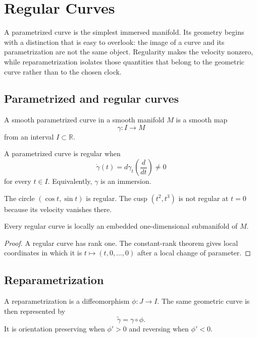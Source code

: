\chapter{Regular Curves}
\label{ch:vii12-regular-curves}

A parametrized curve is the simplest immersed manifold. Its geometry begins with a distinction that is easy to overlook: the image of a curve and its parametrization are not the same object. Regularity makes the velocity nonzero, while reparametrization isolates those quantities that belong to the geometric curve rather than to the chosen clock.

\section{Parametrized and regular curves}
\begin{definition}\label{def:vii12-param-curve}
A smooth parametrized curve in a smooth manifold $M$ is a smooth map
\[
\gamma:I\to M
\]
from an interval $I\subset\mathbb R$.
\end{definition}

\begin{definition}\label{def:vii12-regular}
A parametrized curve is regular when
\[
\dot\gamma(t)=d\gamma_t\left(\frac d{dt}\right)\ne0
\]
for every $t\in I$. Equivalently, $\gamma$ is an immersion.
\end{definition}

\begin{example}\label{ex:vii12-regular-singular}
The circle $(\cos t,\sin t)$ is regular. The cusp $(t^2,t^3)$ is not regular at $t=0$ because its velocity vanishes there.
\end{example}

\begin{proposition}\label{prop:vii12-local-embedded}
Every regular curve is locally an embedded one-dimensional submanifold of $M$.
\end{proposition}
\begin{proof}
A regular curve has rank one. The constant-rank theorem gives local coordinates in which it is $t\mapsto(t,0,\ldots,0)$ after a local change of parameter.
\end{proof}

\section{Reparametrization}
\begin{definition}\label{def:vii12-reparam}
A reparametrization is a diffeomorphism $\phi:J\to I$. The same geometric curve is then represented by
\[
\widetilde\gamma=\gamma\circ\phi.
\]
It is orientation preserving when $\phi'>0$ and reversing when $\phi'<0$.
\end{definition}

